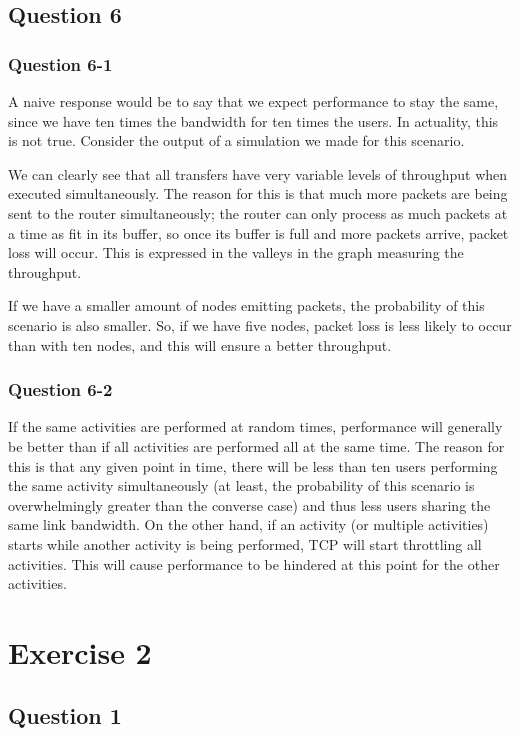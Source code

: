 \documentclass[10pt,a4paper]{article}
\begin{document}
\subsection{Question 6}

\subsubsection{Question 6-1}
A naive response would be to say that we expect performance to stay
the same, since we have ten times the bandwidth for ten times the
users. In actuality, this is not true. Consider the output of a
simulation we made for this scenario.

We can clearly see that all transfers have very variable levels of
throughput when executed simultaneously. The reason for this is that
much more packets are being sent to the router simultaneously; the
router can only process as much packets at a time as fit in its
buffer, so once its buffer is full and more packets arrive, packet
loss will occur. This is expressed in the valleys in the graph
measuring the throughput.

If we have a smaller amount of nodes emitting packets, the probability
of this scenario is also smaller. So, if we have five nodes, packet
loss is less likely to occur than with ten nodes, and this will ensure
a better throughput.

\subsubsection{Question 6-2}

If the same activities are performed at random times, performance will
generally be better than if all activities are performed all at the same
time. The reason for this is that any given point in time, there will
be less than ten users performing the same activity simultaneously (at
least, the probability of this scenario is overwhelmingly greater than
the converse case) and thus less users sharing the same link
bandwidth. On the other hand, if an activity (or multiple activities)
starts while another activity is being performed, TCP will start
throttling all activities. This will cause performance to be hindered
at this point for the other activities.


\section{Exercise 2}
\subsection{Question 1}
\end{document}
